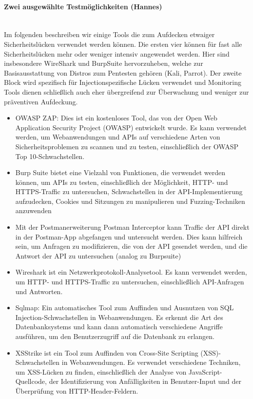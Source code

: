 \documentclass[notitlepage, hidelinks]{article}
\begin{document}
\paragraph{Zwei ausgewählte Testmöglichkeiten (Hannes)} \mbox{} \\
Im folgenden beschreiben wir einige Tools die zum Aufdecken etwaiger Sicherheitslücken verwendet werden können. Die ersten vier können für fast alle Sicherheitslücken mehr oder weniger intensiv angewendet werden. Hier sind insbesondere WireShark und BurpSuite hervorzuheben, welche zur Basisausstattung von Distros zum Pentesten gehören (Kali, Parrot). Der zweite Block wird spezifisch für Injectionspezifische Lücken verwendet und Monitoring Tools dienen schließlich auch eher übergreifend zur Überwachung und weniger zur präventiven Aufdeckung.

\begin{itemize}
\item OWASP ZAP: Dies ist ein kostenloses Tool, das von der Open Web Application Security Project (OWASP) entwickelt wurde. Es kann verwendet werden, um Webanwendungen und APIs auf verschiedene Arten von Sicherheitsproblemen zu scannen und zu testen, einschließlich der OWASP Top 10-Schwachstellen.
\item Burp Suite bietet eine Vielzahl von Funktionen, die verwendet werden können, um APIs zu testen, einschließlich der Möglichkeit, HTTP- und HTTPS-Traffic zu untersuchen, Schwachstellen in der API-Implementierung aufzudecken, Cookies und Sitzungen zu manipulieren und Fuzzing-Techniken anzuwenden
\item Mit der Postmanerweiterung Postman Interceptor kann Traffic der API direkt in der Postman-App abgefangen und untersucht werden. Dies kann hilfreich sein, um Anfragen zu modifizieren, die von der API gesendet werden, und die Antwort der API zu untersuchen (analog zu Burpsuite)
\item Wireshark ist ein Netzwerkprotokoll-Analysetool. Es kann verwendet werden, um HTTP- und HTTPS-Traffic zu untersuchen, einschließlich API-Anfragen und Antworten. 
\item Sqlmap: Ein automatisches Tool zum Auffinden und Ausnutzen von SQL Injection-Schwachstellen in Webanwendungen. Es erkennt die Art des Datenbanksystems und kann dann automatisch verschiedene Angriffe ausführen, um den Benutzerzugriff auf die Datenbank zu erlangen.
\item XSStrike ist ein Tool zum Auffinden von Cross-Site Scripting (XSS)-Schwachstellen in Webanwendungen. Es verwendet verschiedene Techniken, um XSS-Lücken zu finden, einschließlich der Analyse von JavaScript-Quellcode, der Identifizierung von Anfälligkeiten in Benutzer-Input und der Überprüfung von HTTP-Header-Feldern.

\end{itemize}
\end{document}
